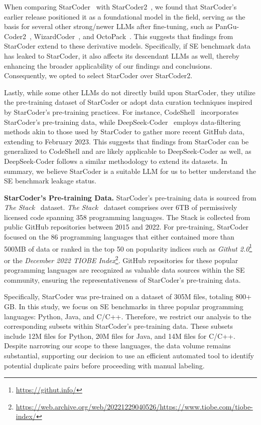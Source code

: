When comparing StarCoder~\cite{starcoder_one} with StarCoder2~\cite{starcoder2}, we found that StarCoder’s earlier release positioned it as a foundational model in the field, serving as the basis for several other strong/newer LLMs after fine-tuning, such as PanGu-Coder2~\cite{shen2023pangu}, WizardCoder~\cite{luo2023wizardcoder}, and OctoPack~\cite{muennighoff2023octopack}. This suggests that findings from StarCoder extend to these derivative models. Specifically, if SE benchmark data has leaked to StarCoder, it also affects its descendant LLMs as well, thereby enhancing the broader applicability of our findings and conclusions. Consequently, we opted to select StarCoder over StarCoder2.

Lastly, while some other LLMs do not directly build upon StarCoder, they utilize the pre-training dataset of StarCoder or adopt data curation techniques inspired by StarCoder’s pre-training practices. For instance, CodeShell~\cite{xie2024codeshell} incorporates StarCoder’s pre-training data, while DeepSeek-Coder~\cite{deepseekcoder} employs data-filtering methods akin to those used by StarCoder to gather more recent GitHub data, extending to February 2023. This suggests that findings from StarCoder can be generalized to CodeShell and are likely applicable to DeepSeek-Coder as well, as DeepSeek-Coder follows a similar methodology to extend its datasets. 
In summary, we believe StarCoder is a suitable LLM for us to better understand the SE benchmark leakage status.


\vspace{0.2cm}
\noindent
\textbf{StarCoder's Pre-training Data.} 
StarCoder’s pre-training data is sourced from \textit{The Stack~\cite{stack}} dataset. \textit{The Stack~\cite{stack}} dataset comprises over 6TB of permissively licensed code spanning 358 programming languages. The Stack is collected from public GitHub repositories between 2015 and 2022. For pre-training, StarCoder focused on the 86 programming languages that either contained more than 500MB of data or ranked in the top 50 on popularity indices such as \textit{Githut 2.0}\footnote{\url{https://githut.info/}} or the \textit{December 2022 TIOBE Index}\footnote{\url{https://web.archive.org/web/20221229040526/https://www.tiobe.com/tiobe-index/}}. GitHub repositories for these popular programming languages are recognized as valuable data sources within the SE community, ensuring the representativeness of StarCoder’s pre-training data.



Specifically, StarCoder was pre-trained on a dataset of 305M files, totaling 800+ GB.
In this study, we focus on SE benchmarks in three popular programming languages: Python, Java, and C/C++. Therefore, we restrict our analysis to the corresponding subsets within StarCoder's pre-training data. 
These subsets include 12M files for Python, 20M files for Java, and 14M files for C/C++. 
Despite narrowing our scope to these languages, the data volume remains substantial, supporting our decision to use an efficient automated tool to identify potential duplicate pairs before proceeding with manual labeling. 



